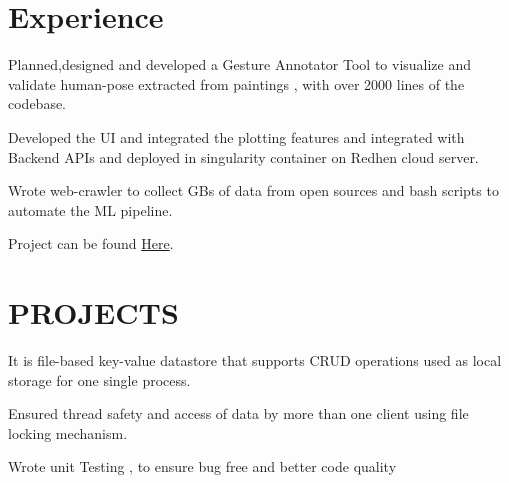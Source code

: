 \documentclass[]{deedy-resume-openfont}
\begin{document}
\hfill
\begin{minipage}[t]{0.66\textwidth} 


\section{Experience}

\vspace{\topsep} %
\begin{tightemize}\item Planned,designed and developed a Gesture Annotator Tool to visualize and
validate human-pose extracted from  paintings , with over 2000 lines of the codebase.
\item Developed the UI and integrated the plotting features and integrated with Backend APIs and deployed in singularity container on Redhen cloud server.
\item Wrote web-crawler to collect GBs of data from open sources and bash scripts
to automate the ML pipeline.
\item Project can be found  \href{https://summerofcode.withgoogle.com/archive/2019/projects/5565179075493888/}{Here}.
\end{tightemize}
\sectionsep

\sectionsep


\section{PROJECTS}
It is file-based key-value datastore that supports  CRUD operations used as local storage for one single process.
\begin{tightemize}
\item Ensured thread safety and access of data by more than one client using file locking mechanism.
\item Wrote unit Testing , to ensure bug free and better code quality
\end{tightemize}
\sectionsep


\end{minipage}
\end{document}
